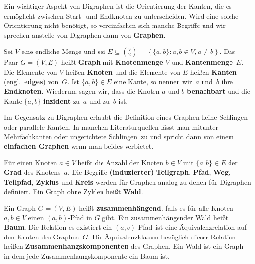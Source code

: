 \begin{bem}
Ein wichtiger Aspekt von Digraphen ist die Orientierung der Kanten, die es ermöglicht zwischen Start- und Endknoten zu unterscheiden.
Wird eine solche Orientierung nicht benötigt, so vereinfachen sich manche Begriffe und wir sprechen anstelle von Digraphen dann von \textbf{Graphen}.
\end{bem} 

\begin{defn} 
Sei $V$ eine endliche Menge und sei $E \subseteq \binom{V}{2}= \left\{ \{a,b\} : a, b \in V, a \ne b \right\}$. 
Das Paar $G=(V,E)$ heißt \textbf{Graph} mit \textbf{Knotenmenge} $V$ und \textbf{Kantenmenge}~$E$.
Die Elemente von $V$ heißen \textbf{Knoten} und die Elemente von $E$ heißen \textbf{Kanten} (engl.~\textbf{edges}) von~$G$.
Ist $\{a,b\} \in E$ eine Kante, so nennen wir~$a$ und~$b$ ihre \textbf{Endknoten}.
Wiederum sagen wir, dass die Knoten $a$ und $b$ \textbf{benachbart} und die Kante $\{a,b\}$ \textbf{inzident} zu~$a$ und zu~$b$ ist.
\end{defn} 

\begin{bem}
Im Gegensatz zu Digraphen erlaubt die Definition eines Graphen keine Schlingen oder parallele Kanten.
In manchen Literaturquellen lässt man mitunter Mehrfachkanten oder \glqq ungerichtete Schlingen\grqq\ zu und spricht dann von einem \textbf{einfachen Graphen} wenn man beides verbietet.
\end{bem}

\begin{defn} 
Für einen Knoten $a \in V$ heißt die Anzahl der Knoten $b \in V$ mit $\{a,b\} \in E$ der \textbf{Grad} des Knotens~$a$.
Die Begriffe \textbf{(induzierter) Teilgraph}, \textbf{Pfad}, \textbf{Weg}, \textbf{Teilpfad}, \textbf{Zyklus} und \textbf{Kreis} werden für Graphen analog zu denen für Digraphen definiert.
Ein Graph ohne Zyklen heißt \textbf{Wald}.
\end{defn}

\begin{defn} 
Ein Graph $G=(V,E)$ heißt \textbf{zusammenhängend}, falls es für alle Knoten $a, b \in V$ einen $(a,b)$-Pfad in $G$ gibt.
Ein zusammenhängender Wald heißt \textbf{Baum}.
Die Relation \glqq es existiert ein $(a,b)$-Pfad\grqq\ ist eine Äquivalenzrelation auf den Knoten des Graphen~$G$.
Die Äquivalenzklassen bezüglich dieser Relation heißen \textbf{Zusammenhangskomponenten} des Graphen.
Ein Wald ist ein Graph in dem jede Zusammenhangskomponente ein Baum ist.
\end{defn} 


